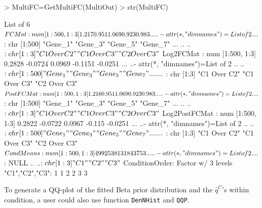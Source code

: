 \documentclass{article}
\begin{document}
\begin{Schunk}
\begin{Sinput}
> MultiFC=GetMultiFC(MultiOut)
> str(MultiFC)
\end{Sinput}
\begin{Soutput}
List of 6
 $ FCMat         : num [1:500, 1:3] 1.217 0.951 1.069 0.923 0.983 ...
  ..- attr(*, "dimnames")=List of 2
  .. ..$ : chr [1:500] "Gene_1" "Gene_3" "Gene_5" "Gene_7" ...
  .. ..$ : chr [1:3] "C1 Over C2" "C1 Over C3" "C2 Over C3"
 $ Log2FCMat     : num [1:500, 1:3] 0.2828 -0.0724 0.0969 -0.1151 -0.0251 ...
  ..- attr(*, "dimnames")=List of 2
  .. ..$ : chr [1:500] "Gene_1" "Gene_3" "Gene_5" "Gene_7" ...
  .. ..$ : chr [1:3] "C1 Over C2" "C1 Over C3" "C2 Over C3"
 $ PostFCMat     : num [1:500, 1:3] 1.216 0.951 1.069 0.923 0.983 ...
  ..- attr(*, "dimnames")=List of 2
  .. ..$ : chr [1:500] "Gene_1" "Gene_3" "Gene_5" "Gene_7" ...
  .. ..$ : chr [1:3] "C1 Over C2" "C1 Over C3" "C2 Over C3"
 $ Log2PostFCMat : num [1:500, 1:3] 0.2822 -0.0722 0.0967 -0.115 -0.0251 ...
  ..- attr(*, "dimnames")=List of 2
  .. ..$ : chr [1:500] "Gene_1" "Gene_3" "Gene_5" "Gene_7" ...
  .. ..$ : chr [1:3] "C1 Over C2" "C1 Over C3" "C2 Over C3"
 $ CondMeans     : num [1:500, 1:3] 499 253 813 1843 753 ...
  ..- attr(*, "dimnames")=List of 2
  .. ..$ : NULL
  .. ..$ : chr [1:3] "C1" "C2" "C3"
 $ ConditionOrder: Factor w/ 3 levels "C1","C2","C3": 1 1 2 2 3 3
\end{Soutput}
\end{Schunk}

\noindent To generate a QQ-plot of the fitted Beta prior distribution 
and the $\hat{q}^C$'s within condition, a user could also use function 
\verb+DenNHist+ and \verb+QQP+.
\end{document}
